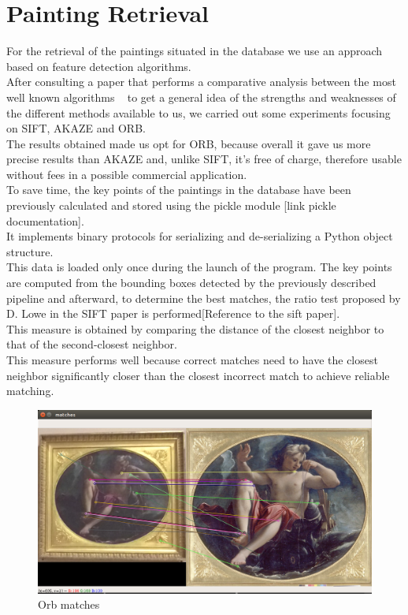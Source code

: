 \documentclass[conference]{IEEEtran}
\begin{document}
\section{Painting Retrieval}
For the retrieval of the paintings situated in the database we use an approach based on feature detection algorithms.\\ 
After consulting a paper that performs a comparative analysis between the most well known algorithms ~\cite{b1} to get a general idea of the strengths and weaknesses of the different methods available to us, we carried out some experiments focusing on SIFT, AKAZE and ORB.\\
The results obtained made us opt for ORB, because overall it gave us more precise results than AKAZE and, unlike SIFT, it’s free of charge, therefore usable without fees in a possible commercial application.\\
To save time, the key points of the paintings in the database have been previously calculated and stored using the pickle module [link pickle documentation].\\
It implements binary protocols for serializing and de-serializing a Python object structure.\\
This data is loaded only once during the launch of the program.
The key points are computed from the bounding boxes detected by the previously described pipeline and afterward, to determine the best matches, the ratio test proposed by D. Lowe in the SIFT paper is performed[Reference to the sift paper].\\
This measure is obtained by comparing the distance of the closest neighbor to that of the second-closest neighbor.\\
This measure performs well because correct matches need to have the closest neighbor significantly closer than the closest incorrect match to achieve reliable matching.\\

\begin{figure}[htbp]
\centerline{\includegraphics[width=0.8\columnwidth]{../Orb_matches/match3.png}}
\caption{Orb matches}
\label{fig_Orb_matches}
\end{figure}
\end{document}

